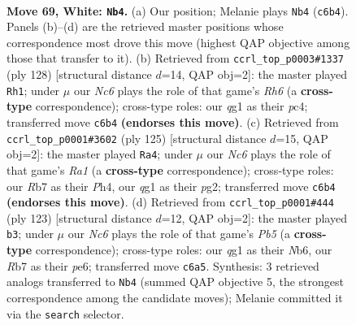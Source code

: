 \documentclass[11pt]{article}
\begin{document}
\clearpage

\begin{figure}[p]\centering
\begin{subfigure}{0.46\textwidth}\centering
\resizebox{\linewidth}{!}{%
\newchessgame
\chessboard[
  setfen={8/1R6/2Np4/8/5k2/5n1K/8/6q1 w - - 0 69},
  showmover=false,
  pgfstyle=straightmove, color=movearrow, markmove={c6-b4}
]}
\caption{}
\end{subfigure}\hfill
\begin{subfigure}{0.46\textwidth}\centering
\resizebox{\linewidth}{!}{%
\newchessgame
\chessboard[
  setfen={8/8/7R/4n1p1/2p1k3/6K1/8/8 w - - 1 65},
  showmover=false,
  pgfstyle=straightmove, color=movearrow, markmove={h6-h1}
]}
\caption{}
\end{subfigure}
\\[4pt]
\begin{subfigure}{0.46\textwidth}\centering
\resizebox{\linewidth}{!}{%
\newchessgame
\chessboard[
  setfen={r7/8/8/1k6/7p/3KN3/6P1/8 b - - 1 63},
  showmover=false,
  pgfstyle=straightmove, color=movearrow, markmove={a8-a4}
]}
\caption{}
\end{subfigure}\hfill
\begin{subfigure}{0.46\textwidth}\centering
\resizebox{\linewidth}{!}{%
\newchessgame
\chessboard[
  setfen={8/8/1n2P3/8/1p1NK1k1/8/8/8 b - - 0 62},
  showmover=false,
  pgfstyle=straightmove, color=movearrow, markmove={b4-b3}
]}
\caption{}
\end{subfigure}
\caption{\textbf{Move 69, White: \texttt{Nb4}.} (a) Our position; Melanie plays \texttt{Nb4} (\texttt{c6b4}). Panels (b)--(d) are the retrieved master positions whose correspondence most drove this move (highest QAP objective among those that transfer to it). (b) Retrieved from \texttt{ccrl\_top\_p0003\#1337} (ply 128) [structural distance $d$=14, QAP obj=2]: the master played \texttt{Rh1}; under $\mu$ our \emph{Nc6} plays the role of that game's \emph{Rh6} (a \textbf{cross-type} correspondence); cross-type roles: our \emph{q}g1 as their \emph{p}c4; transferred move \texttt{c6b4} \textbf{(endorses this move)}. (c) Retrieved from \texttt{ccrl\_top\_p0001\#3602} (ply 125) [structural distance $d$=15, QAP obj=2]: the master played \texttt{Ra4}; under $\mu$ our \emph{Nc6} plays the role of that game's \emph{Ra1} (a \textbf{cross-type} correspondence); cross-type roles: our \emph{R}b7 as their \emph{P}h4, our \emph{q}g1 as their \emph{p}g2; transferred move \texttt{c6b4} \textbf{(endorses this move)}. (d) Retrieved from \texttt{ccrl\_top\_p0001\#444} (ply 123) [structural distance $d$=12, QAP obj=2]: the master played \texttt{b3}; under $\mu$ our \emph{Nc6} plays the role of that game's \emph{Pb5} (a \textbf{cross-type} correspondence); cross-type roles: our \emph{q}g1 as their \emph{N}b6, our \emph{R}b7 as their \emph{p}e6; transferred move \texttt{c6a5}. Synthesis: 3 retrieved analogs transferred to \texttt{Nb4} (summed QAP objective 5, the strongest correspondence among the candidate moves); Melanie committed it via the \texttt{search} selector.}
\label{fig:thought-m136}
\end{figure}
\end{document}
